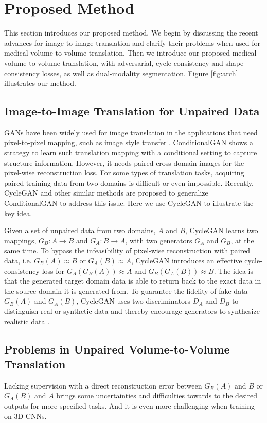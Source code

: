 \documentclass[10pt,twocolumn,letterpaper]{article}
\begin{document}


\section{Proposed Method}
This section introduces our proposed method. We begin by discussing the recent advances for image-to-image translation and clarify their problems when used for medical volume-to-volume translation. Then we introduce our proposed medical volume-to-volume translation, with adversarial, cycle-consistency and shape-consistency losses, as well as dual-modality segmentation. Figure \ref{fig:arch} illustrates our method.

\subsection{Image-to-Image Translation for Unpaired Data}
GANs have been widely used for image translation in the applications that need pixel-to-pixel mapping, such as image style transfer \cite{zhang2016colorful}. ConditionalGAN \cite{isola2016image} shows a strategy to learn such translation mapping with a conditional setting to capture structure information.
However, it needs paired cross-domain images for the pixel-wise reconstruction loss. For some types of translation tasks, acquiring paired training data from two domains is difficult or even impossible. Recently, CycleGAN \cite{zhu2017unpaired} and other similar methods \cite{kim2017learning,yi2017dualgan} are proposed to generalize ConditionalGAN to address this issue.  Here we use CycleGAN to illustrate the key idea.

Given a set of unpaired data from two domains, $A$ and $B$, CycleGAN learns two mappings, $G_B: A \rightarrow B$ and  $G_A: B \rightarrow A$, with two generators $G_A$ and $G_B$, at the same time. To bypass the infeasibility of pixel-wise reconstruction with paired data, i.e. $G_B(A) \approx B$ or $G_A(B) \approx A$, CycleGAN introduces an effective cycle-consistency loss for $G_A(G_B(A)) \approx A$ and $G_B(G_A(B)) \approx B$. The idea is that the generated target domain data is able to return back to the exact data in the source domain it is generated from.
To guarantee the fidelity of fake data $G_B(A)$ and $G_A(B)$, CycleGAN uses two discriminators $D_A$ and $D_B$ to distinguish real or synthetic data and thereby encourage generators to synthesize realistic data \cite{goodfellow2014generative}. 

\subsection{Problems in Unpaired Volume-to-Volume Translation}
Lacking supervision with a direct reconstruction error between $G_B(A)$ and $B$ or $G_A(B)$ and $A$ brings some uncertainties and difficulties towards to the desired outputs for more specified tasks. And it is even more challenging when training on 3D CNNs.
\end{document}
